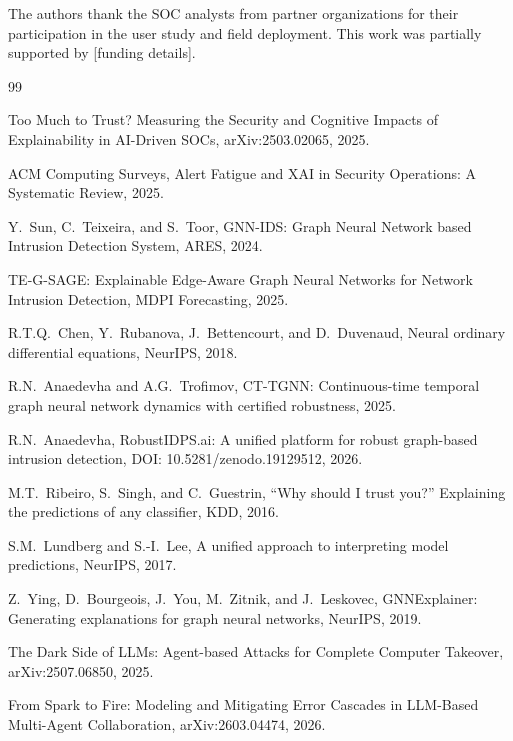 \documentclass[preprint,review,12pt]{elsarticle}
\begin{document}
The authors thank the SOC analysts from partner organizations for their participation in the user study and field deployment. This work was partially supported by [funding details].



\begin{thebibliography}{99}

 Too Much to Trust? Measuring the Security and Cognitive Impacts of Explainability in AI-Driven SOCs, arXiv:2503.02065, 2025.

 ACM Computing Surveys, Alert Fatigue and XAI in Security Operations: A Systematic Review, 2025.

 Y.~Sun, C.~Teixeira, and S.~Toor, GNN-IDS: Graph Neural Network based Intrusion Detection System, ARES, 2024.

 TE-G-SAGE: Explainable Edge-Aware Graph Neural Networks for Network Intrusion Detection, MDPI Forecasting, 2025.

 R.T.Q.~Chen, Y.~Rubanova, J.~Bettencourt, and D.~Duvenaud, Neural ordinary differential equations, NeurIPS, 2018.

 R.N.~Anaedevha and A.G.~Trofimov, CT-TGNN: Continuous-time temporal graph neural network dynamics with certified robustness, 2025.

 R.N.~Anaedevha, RobustIDPS.ai: A unified platform for robust graph-based intrusion detection, DOI: 10.5281/zenodo.19129512, 2026.

 M.T.~Ribeiro, S.~Singh, and C.~Guestrin, ``Why should I trust you?'' Explaining the predictions of any classifier, KDD, 2016.

 S.M.~Lundberg and S.-I.~Lee, A unified approach to interpreting model predictions, NeurIPS, 2017.

 Z.~Ying, D.~Bourgeois, J.~You, M.~Zitnik, and J.~Leskovec, GNNExplainer: Generating explanations for graph neural networks, NeurIPS, 2019.

 The Dark Side of LLMs: Agent-based Attacks for Complete Computer Takeover, arXiv:2507.06850, 2025.

 From Spark to Fire: Modeling and Mitigating Error Cascades in LLM-Based Multi-Agent Collaboration, arXiv:2603.04474, 2026.


\end{thebibliography}
\end{document}
